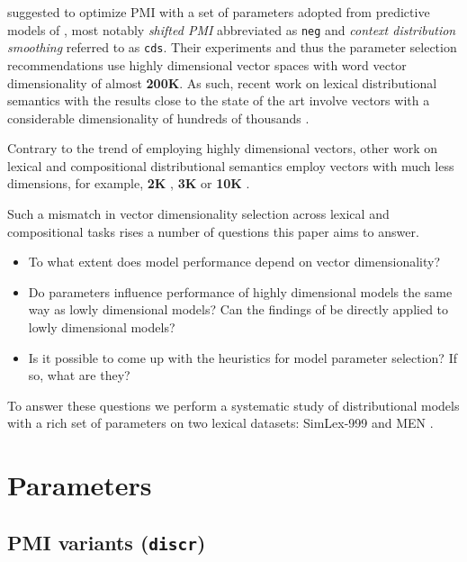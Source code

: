 \documentclass[11pt,letterpaper]{article}
\begin{document}
 suggested to optimize PMI with a  set of parameters adopted from predictive models of , most notably \emph{shifted PMI} abbreviated as \texttt{neg} and \emph{context distribution smoothing} referred to as \texttt{cds}. Their experiments and thus the parameter selection recommendations use highly dimensional vector spaces with word vector  dimensionality of almost \textbf{200K}. As such, recent work on lexical distributional semantics with the results close to the state of the art involve vectors with a considerable dimensionality of hundreds of thousands \cite{baroni-dinu-kruszewski:2014:P14-1,kiela-clark:2014:CVSC}.

Contrary to the trend of employing highly dimensional vectors, other work on lexical and compositional distributional semantics employ vectors with much less dimensions, for example, \textbf{2K} \cite{Grefenstette:2011:ESC:2145432.2145580,kartsadrqpl2014,milajevs-EtAl:2014:EMNLP2014}, \textbf{3K} \cite{Dinu:2010:MDS:1870658.1870771,milajevs-purver:2014:CVSC} or \textbf{10K} \cite{polajnar-clark:2014:EACL,Baroni2010nouns}.

Such a mismatch in vector dimensionality selection across lexical and compositional tasks rises a number of questions this paper aims to answer.
\begin{itemize}
\item To what extent does model performance depend on vector dimensionality?
\item Do parameters influence performance of highly dimensional models the same way as lowly dimensional models? Can the findings of  be directly applied to lowly dimensional models?
\item Is it possible to come up with the heuristics for model parameter selection? If so, what are they?
\end{itemize}

To answer these questions we perform a systematic study of distributional models with a rich set of parameters on two lexical datasets: SimLex-999 \cite{hill2014simlex} and MEN \cite{Bruni:2014:MDS:2655713.2655714}.

\section{Parameters}
\label{sec:parameters}

\subsection{PMI variants (\texttt{discr})}
\label{sec:pmi-variants}
\end{document}

